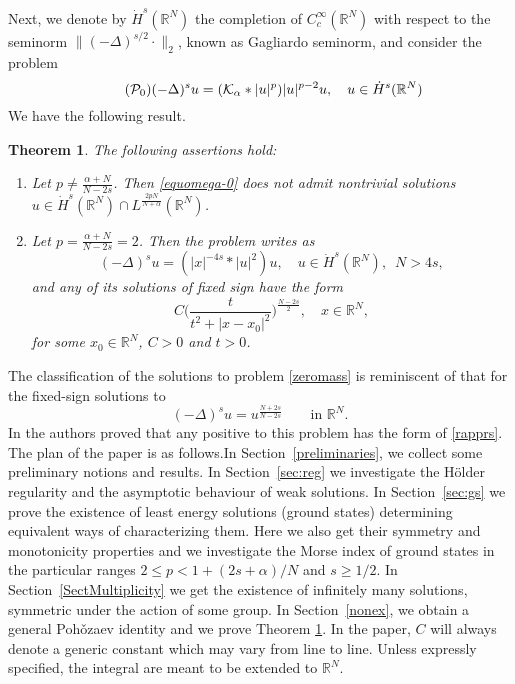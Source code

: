 \documentclass[10pt]{amsart}
\numberwithin{equation}{section}
\newtheorem{theorem}{Theorem}[section]
\begin{document}
\vskip5pt
\noindent
Next, we denote by $\dot H^{s}({{\mathbb R}}^N)$ the completion of $C^\infty_c({{\mathbb R}}^N)$ with respect
to the seminorm $\|(-\Delta)^{s/2}\cdot \|_2$, known as Gagliardo seminorm, and consider the problem
\begin{equation} \label{equomega-0} \tag{$\mathcal{P}_0$}
{{(-\Delta)^{s}}} u={{(\mathcal K_{\alpha}*|u|^{p})}} |u|^{p-2}u,
\quad u\in \dot H^{s}(\mathbb R^{N})
\end{equation}
We have the following result.
\begin{theorem}
\label{pohoz-cons-2}
The following assertions hold:
\begin{enumerate}
\item Let $p\neq \frac{\alpha+N}{N-2s}$.
Then  \eqref{equomega-0} does not admit nontrivial solutions $u \in \dot H^s({{\mathbb R}}^N)\cap L^{\frac{2pN}{N+\alpha}}({{\mathbb R}}^N)$. 
\item Let $p=\frac{\alpha+N}{N-2s}=2$.
Then the problem writes as
\begin{equation}
\label{zeromass}
{{(-\Delta)^{s}}} u=(|x|^{-4s}*|u|^2)u,
\quad u\in \dot H^{s}({{\mathbb R}}^N), \,\,\, N>4s,
\end{equation}
and any of its solutions of fixed sign have the form
\begin{equation}
\label{rapprs}
C\Big(\frac{t}{t^2+|x-x_0|^2}\Big)^{\frac{N-2s}{2}},\quad x\in{{\mathbb R}}^N,
\end{equation}
for some $x_0\in{{\mathbb R}}^N$, $C>0$ and $t>0$.
\end{enumerate}
\end{theorem}
\noindent
The classification of the solutions to problem \eqref{zeromass} is reminiscent
of that for the fixed-sign solutions to 
\begin{equation*}
(-\Delta)^s u=u^{\frac{N+2s}{N-2s}} \qquad \text{in ${{\mathbb R}}^N$.}
\end{equation*}
In \cite{classif} the authors proved that any positive to this problem has the form of \eqref{rapprs}.
\vskip4pt
\noindent
The plan of the paper is as follows.\newline  In Section~\ref{preliminaries}, we collect some preliminary notions and results. \newline
In Section~\ref{sec:reg} we investigate the H\"older regularity and the asymptotic behaviour of weak solutions. \newline  
In Section~\ref{sec:gs}
we prove the existence of least energy solutions (ground states) determining equivalent ways of characterizing them. Here we also get their symmetry
and monotonicity properties
and we investigate the Morse index of ground states in the particular ranges $2\leq p<1+(2s+\alpha)/N$ and $s\geq1/2$.  \newline
In Section~\ref{SectMultiplicity} we get the existence of infinitely many solutions, symmetric under the action of some group. \newline
In Section~\ref{nonex}, we obtain a general Poh\v ozaev identity
and we prove Theorem \ref{pohoz-cons-2}.
\vskip2pt
\noindent
In  the paper, $C$ will always denote a generic constant which may vary from line to line. Unless expressly specified, the integral are meant to be extended to $\mathbb{R}^N$.
\end{document}
